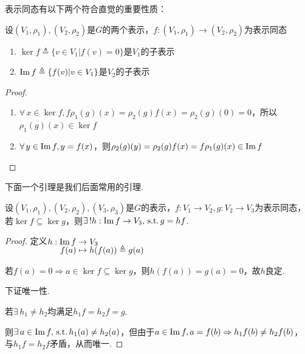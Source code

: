 表示同态有以下两个符合直觉的重要性质：
\begin{property}[表示同态]
    设$(V_1,\rho_1),(V_2,\rho_2)$是$G$的两个表示，$f:(V_1,\rho_1)\to(V_2,\rho_2)$为表示同态
    \begin{enumerate}
        \item $\ker f\triangleq \{v\in V_1|f(v)=0\}$是$V_1$的子表示
        \item $\operatorname{Im} f \triangleq \{f(v)|v\in V_1\}$是$V_2$的子表示
    \end{enumerate}
\end{property}
\begin{proof}
    \begin{enumerate}
        \item $\forall\, x\in \ker f,f\rho_1(g)(x)=\rho_2(g)f(x)=\rho_2(g)(0)=0$，所以$\rho_1(g)(x)\in \ker f$
        \item $\forall\, y\in \operatorname{Im} f,y=f(x)$，则$\rho_2(g)(y)=\rho_2(g)f(x)=f\rho_1(g)(x)\in \operatorname{Im} f$ \qedhere
    \end{enumerate}
\end{proof}

下面一个引理是我们后面常用的引理.
\begin{lemma}[][lem:1.1]
    设$(V_1,\rho_1),(V_2,\rho_2),(V_3,\rho_3)$是$G$的表示，$f:V_1\to V_2,g:V_2\to V_3$为表示同态，若$\ker f\subseteq \ker g$，则$\exists\, !h:\operatorname{Im} f\to V_3,\operatorname{\,\text{s.t.}} g=hf$.
    \begin{center}
    \end{center}
\end{lemma}
\begin{proof}
    定义$\setjot[-4]\begin{aligned}[t]
        h:\im f&\to V_3 \\
        f(a)&\mapsto h(f(a))\triangleq g(a)
    \end{aligned}$\par
    若$f(a)=0\Rightarrow a\in\ker f\subseteq \ker g$，则$h(f(a))=g(a)=0$，故$h$良定.\par
    下证唯一性.\par
    若$\exists\, h_1\neq h_2$均满足$h_1f=h_2f=g$.\par
    则$\exists\, a\in \operatorname{Im} f,\operatorname{\,\text{s.t.}} h_1(a)\neq h_2(a)$，但由于$a\in \operatorname{Im} f,a=f(b)\Rightarrow h_1f(b)\neq h_2f(b)$，与$h_1f=h_2f$矛盾，从而唯一.
\end{proof}

